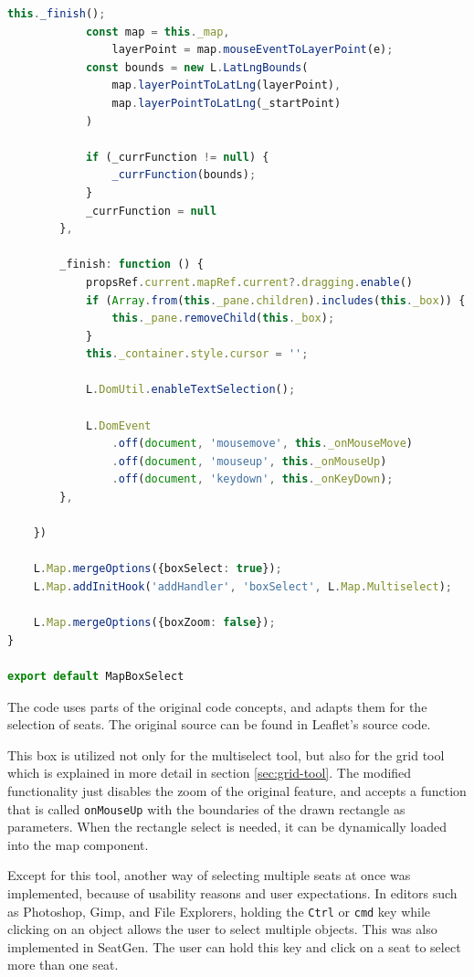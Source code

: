 \begin{lstlisting}[language=Typescript, caption={Multiselect Tool},label={lst:multiselect-tool}]
            this._finish();
            const map = this._map,
                layerPoint = map.mouseEventToLayerPoint(e);
            const bounds = new L.LatLngBounds(
                map.layerPointToLatLng(layerPoint),
                map.layerPointToLatLng(_startPoint)
            )

            if (_currFunction != null) {
                _currFunction(bounds);
            }
            _currFunction = null
        },

        _finish: function () {
            propsRef.current.mapRef.current?.dragging.enable()
            if (Array.from(this._pane.children).includes(this._box)) {
                this._pane.removeChild(this._box);
            }
            this._container.style.cursor = '';

            L.DomUtil.enableTextSelection();

            L.DomEvent
                .off(document, 'mousemove', this._onMouseMove)
                .off(document, 'mouseup', this._onMouseUp)
                .off(document, 'keydown', this._onKeyDown);
        },

    })

    L.Map.mergeOptions({boxSelect: true});
    L.Map.addInitHook('addHandler', 'boxSelect', L.Map.Multiselect);

    L.Map.mergeOptions({boxZoom: false});
}

export default MapBoxSelect
\end{lstlisting}

The code uses parts of the original code concepts, and adapts them for the selection of seats. The original source can be found in Leaflet's source code.

This box is utilized not only for the multiselect tool, but also for the grid tool which is explained in more detail in section \ref{sec:grid-tool}. The modified functionality just disables the zoom of the original feature, and accepts a function that is called \texttt{onMouseUp} with the boundaries of the drawn rectangle as parameters. When the rectangle select is needed, it can be dynamically loaded into the map component.

Except for this tool, another way of selecting multiple seats at once was implemented, because of usability reasons and user expectations. In editors such as Photoshop, Gimp, and File Explorers, holding the \texttt{Ctrl} or \texttt{cmd} key while clicking on an object allows the user to select multiple objects. This was also implemented in SeatGen. The user can hold this key and click on a seat to select more than one seat.